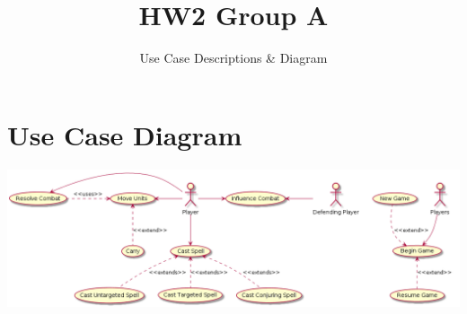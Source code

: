 ﻿\documentclass{article}
\title{HW2 Group A}
\subtitle{Use Case Descriptions \& Diagram}
\newenvironment{al}
{\begin{description}[leftmargin=!,labelwidth=\widthof{\bfseries Preconditions:}]}
{\end{description}}
\newcounter{twocoli}
\newenvironment{twocol}
{ \setcounter{twocoli}{1}
  \begin{tabular}{ p{0.45\textwidth} p{0.43\textwidth}} }
{ \end{tabular} }
\newcommand{\tabrow}[2]
{   \arabic{twocoli}. \  \parbox[t]{0.40\textwidth}{#1 \vspace{0.1 in}} \stepcounter{twocoli} 
  & \arabic{twocoli}. \  \parbox[t]{0.47\textwidth}{#2 \vspace{0.1 in}} \stepcounter{twocoli}\\}
\newcommand{\tableft}[1]
{   \arabic{twocoli}. \  \parbox[t]{0.40\textwidth}{#1 \vspace{0.1 in}} & \parbox[t]{0.47\textwidth}{ \vspace{0.1 in}} \stepcounter{twocoli}\\}
\begin{document}
\section*{Use Case Diagram}
\includegraphics[width=\textwidth]{use_cases.png}

\tableofcontents

\end{document}
